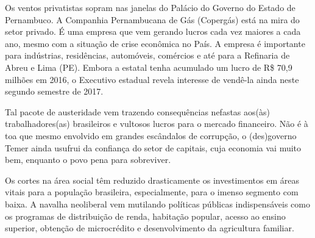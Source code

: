 Os ventos privatistas sopram nas janelas do Palácio do Governo do Estado
de Pernambuco. A Companhia Pernambucana de Gás (Copergás) está na mira
do setor privado. É uma empresa que vem gerando lucros cada vez maiores
a cada ano, mesmo com a situação de crise econômica no País. A empresa é
importante para indústrias, residências, automóveis, comércios e até
para a Refinaria de Abreu e Lima (PE). Embora a estatal tenha acumulado
um lucro de R\$ 70,9 milhões em 2016, o Executivo estadual revela
interesse de vendê-la ainda neste segundo semestre de 2017.

Tal pacote de austeridade vem trazendo consequências nefastas aos(às)
trabalhadores(as) brasileiros e vultosos lucros para o mercado
financeiro. Não é à toa que mesmo envolvido em grandes escândalos de
corrupção, o (des)governo Temer ainda usufrui da confiança do setor de
capitais, cuja economia vai muito bem, enquanto o povo pena para
sobreviver.

Os cortes na área social têm reduzido drasticamente os investimentos em
áreas vitais para a população brasileira, especialmente, para o imenso
segmento com baixa. A navalha neoliberal vem mutilando políticas
públicas indispensáveis como os programas de distribuição de renda,
habitação popular, acesso ao ensino superior, obtenção de microcrédito e
desenvolvimento da agricultura familiar.


